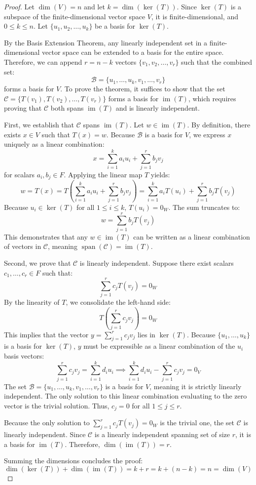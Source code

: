 \begin{proof}
Let $\dim(V) = n$ and let $k = \dim(\ker(T))$. Since $\ker(T)$ is a subspace of the finite-dimensional vector space $V$, it is finite-dimensional, and $0 \le k \le n$. Let $\{u_1, u_2, \dots, u_k\}$ be a basis for $\ker(T)$. 
    
By the Basis Extension Theorem, any linearly independent set in a finite-dimensional vector space can be extended to a basis for the entire space. Therefore, we can append $r = n - k$ vectors $\{v_1, v_2, \dots, v_r\}$ such that the combined set:
\[
\mathcal{B} = \{u_1, \dots, u_k, v_1, \dots, v_r\}
\]
forms a basis for $V$. To prove the theorem, it suffices to show that the set $\mathcal{C} = \{T(v_1), T(v_2), \dots, T(v_r)\}$ forms a basis for $\operatorname{im}(T)$, which requires proving that $\mathcal{C}$ both spans $\operatorname{im}(T)$ and is linearly independent.

First, we establish that $\mathcal{C}$ spans $\operatorname{im}(T)$. Let $w \in \operatorname{im}(T)$. By definition, there exists $x \in V$ such that $T(x) = w$. Because $\mathcal{B}$ is a basis for $V$, we express $x$ uniquely as a linear combination:
\[
x = \sum_{i=1}^k a_i u_i + \sum_{j=1}^r b_j v_j
\]
for scalars $a_i, b_j \in F$. Applying the linear map $T$ yields:
\[
w = T(x) = T\left(\sum_{i=1}^k a_i u_i + \sum_{j=1}^r b_j v_j\right) = \sum_{i=1}^k a_i T(u_i) + \sum_{j=1}^r b_j T(v_j)
\]
Because $u_i \in \ker(T)$ for all $1 \le i \le k$, $T(u_i) = 0_W$. The sum truncates to:
\[
w = \sum_{j=1}^r b_j T(v_j)
\]
This demonstrates that any $w \in \operatorname{im}(T)$ can be written as a linear combination of vectors in $\mathcal{C}$, meaning $\operatorname{span}(\mathcal{C}) = \operatorname{im}(T)$.

Second, we prove that $\mathcal{C}$ is linearly independent. Suppose there exist scalars $c_1, \dots, c_r \in F$ such that:
\[
\sum_{j=1}^r c_j T(v_j) = 0_W
\]
By the linearity of $T$, we consolidate the left-hand side:
\[
T\left(\sum_{j=1}^r c_j v_j\right) = 0_W
\]
This implies that the vector $y = \sum_{j=1}^r c_j v_j$ lies in $\ker(T)$. Because $\{u_1, \dots, u_k\}$ is a basis for $\ker(T)$, $y$ must be expressible as a linear combination of the $u_i$ basis vectors:
\[
\sum_{j=1}^r c_j v_j = \sum_{i=1}^k d_i u_i \implies \sum_{i=1}^k d_i u_i - \sum_{j=1}^r c_j v_j = 0_V
\]
The set $\mathcal{B} = \{u_1, \dots, u_k, v_1, \dots, v_r\}$ is a basis for $V$, meaning it is strictly linearly independent. The only solution to this linear combination evaluating to the zero vector is the trivial solution. Thus, $c_j = 0$ for all $1 \le j \le r$.
    
Because the only solution to $\sum_{j=1}^r c_j T(v_j) = 0_W$ is the trivial one, the set $\mathcal{C}$ is linearly independent. Since $\mathcal{C}$ is a linearly independent spanning set of size $r$, it is a basis for $\operatorname{im}(T)$. Therefore, $\dim(\operatorname{im}(T)) = r$. 

Summing the dimensions concludes the proof:
\[
\dim(\ker(T)) + \dim(\operatorname{im}(T)) = k + r = k + (n - k) = n = \dim(V)
\]
\end{proof}
